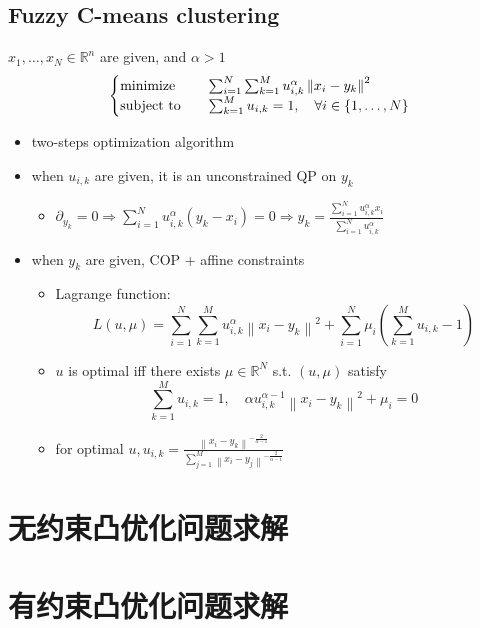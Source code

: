 \subsection{Fuzzy C-means clustering}
\begin{remark}
    $x_1, \dots, x_N \in \mathbb{R}^n$ are given, and $\alpha > 1$\[\begin{cases}
        \operatorname{minimize} \quad &\sum_{i=1}^{N} \sum_{k=1}^{M} u_{i, k}^{\alpha}\left\|x_{i}-y_{k}\right\|^{2} \\
        \operatorname{subject\ to} \quad &\sum_{k=1}^{M} u_{i, k}=1, \quad \forall i \in\{1, \ldots, N\}
    \end{cases}\]
    \begin{itemize}
        \item two-steps optimization algorithm
        \item when $u_{i, k}$ are given, it is an unconstrained QP on $y_k$\begin{itemize}
            \item $\partial_{y_{k}}=0 \Longrightarrow \sum_{i=1}^{N} u_{i, k}^{\alpha}\left(y_{k}-x_{i}\right)=0 \Longrightarrow y_{k}=\frac{\sum_{i=1}^{N} u_{i, k}^{\alpha} x_{i}}{\sum_{i=1}^{N} u_{i, k}^{\alpha}}$
        \end{itemize} 
        \item when $y_k$ are given, COP + affine constraints\begin{itemize}
            \item Lagrange function:\[L(u, \mu)=\sum_{i=1}^{N} \sum_{k=1}^{M} u_{i, k}^{\alpha}\left\|x_{i}-y_{k}\right\|^{2}+\sum_{i=1}^{N} \mu_{i}\left(\sum_{k=1}^{M} u_{i, k}-1\right)\]
            \item $u$ is optimal iff there exists $\mu \in \mathbb{R}^N$ s.t. $(u, \mu)$ satisfy\[\sum_{k=1}^{M} u_{i, k}=1, \quad \alpha u_{i, k}^{\alpha-1}\left\|x_{i}-y_{k}\right\|^{2}+\mu_{i}=0\]
            \item for optimal $u, u_{i, k} = \frac{\left\|x_{i}-y_{k}\right\|^{-\frac{2}{\alpha - 1}}}{\sum_{j=1}^{M}\left\|x_{i}-y_{j}\right\|^{-\frac{2}{\alpha-1}}}$
        \end{itemize}
    \end{itemize}
\end{remark}


\section{无约束凸优化问题求解}
\section{有约束凸优化问题求解}

